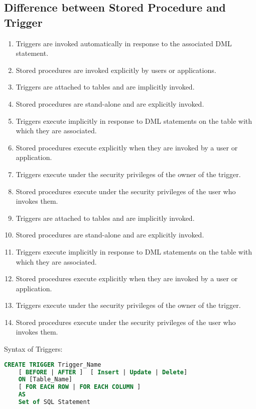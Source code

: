 \documentclass[11pt]{article}
\begin{document}
\subsection{Difference between Stored Procedure and Trigger}
\begin{enumerate}
    \item Triggers are invoked automatically in response to the associated DML statement.
    \item Stored procedures are invoked explicitly by users or applications.
    \item Triggers are attached to tables and are implicitly invoked.
    \item Stored procedures are stand-alone and are explicitly invoked.
    \item Triggers execute implicitly in response to DML statements on the table with which they are associated.
    \item Stored procedures execute explicitly when they are invoked by a user or application.
    \item Triggers execute under the security privileges of the owner of the trigger.
    \item Stored procedures execute under the security privileges of the user who invokes them.
    \item Triggers are attached to tables and are implicitly invoked.
    \item Stored procedures are stand-alone and are explicitly invoked.
    \item Triggers execute implicitly in response to DML statements on the table with which they are associated.
    \item Stored procedures execute explicitly when they are invoked by a user or application.
    \item Triggers execute under the security privileges of the owner of the trigger.
    \item Stored procedures execute under the security privileges of the user who invokes them.
\end{enumerate}

Syntax of Triggers: 

\begin{lstlisting}[language=sql]
    CREATE TRIGGER Trigger_Name  
    [ BEFORE | AFTER ]  [ Insert | Update | Delete]  
    ON [Table_Name]  
    [ FOR EACH ROW | FOR EACH COLUMN ]  
    AS  
    Set of SQL Statement  
\end{lstlisting}
\end{document}
